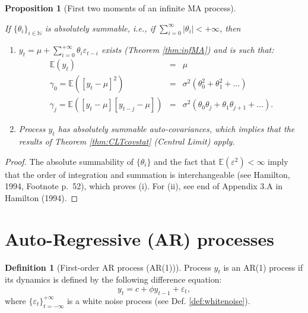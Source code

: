 \documentclass[
  12pt,
]{book}
\providecommand{\tightlist}{%
  \setlength{\itemsep}{0pt}\setlength{\parskip}{0pt}}
\newtheorem{proposition}{Proposition}[chapter]
\theoremstyle{definition}
\newtheorem{definition}{Definition}[chapter]
\theoremstyle{definition}
\theoremstyle{definition}
\theoremstyle{definition}
\theoremstyle{remark}
\begin{document}
\begin{proposition}[First two moments of an infinite MA process]
\protect\hypertarget{prp:momentsMAinf}{}\label{prp:momentsMAinf}

If \(\{\theta_{i}\}_{i\in\mathbb{N}}\) is absolutely summable, i.e., if \(\sum_{i=0}^{\infty}|\theta_i| < + \infty\), then

\begin{enumerate}
\def\labelenumi{\roman{enumi}.}
\tightlist
\item
  \(y_t = \mu + \sum_{i=0}^{+\infty} \theta_{i} \varepsilon_{t-i}\) exists (Theorem \ref{thm:infMA}) and is such that:
  \begin{eqnarray*}
  \mathbb{E}(y_t) &=& \mu\\
  \gamma_0 = \mathbb{E}([y_t-\mu]^2) &=& \sigma^2(\theta_0^2 +\theta_1^2 + \dots)\\
  \gamma_j = \mathbb{E}([y_t-\mu][y_{t-j}-\mu]) &=& \sigma^2(\theta_0\theta_j + \theta_{1}\theta_{j+1} + \dots).
  \end{eqnarray*}
\item
  Process \(y_t\) has absolutely summable auto-covariances, which implies that the results of Theorem \ref{thm:CLTcovstat} (Central Limit) apply.
\end{enumerate}

\end{proposition}

\begin{proof}
The absolute summability of \(\{\theta_{i}\}\) and the fact that \(\mathbb{E}(\varepsilon^2)<\infty\) imply that the order of integration and summation is interchangeable (see Hamilton, 1994, Footnote p.~52), which proves (i). For (ii), see end of Appendix 3.A in Hamilton (1994).
\end{proof}

\hypertarget{ARsection}{%
\section{Auto-Regressive (AR) processes}\label{ARsection}}

\begin{definition}[First-order AR process (AR(1))]
\protect\hypertarget{def:AR1}{}\label{def:AR1}Process \(y_t\) is an AR(1) process if its dynamics is defined by the following difference equation:
\[
y_t = c + \phi y_{t-1} + \varepsilon_t,
\]
where \(\{\varepsilon_t\}_{t = -\infty}^{+\infty}\) is a white noise process (see Def. \ref{def:whitenoise}).
\end{definition}
\end{document}
